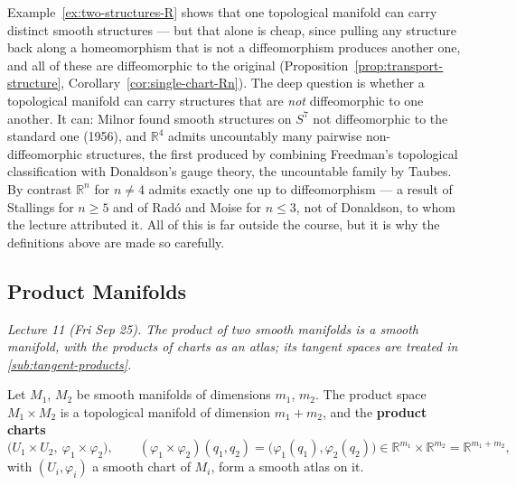 \documentclass[11pt]{report}
\makeatletter
\newcounter{thmcounter}[section]
\newcommand{\thmlabel}[1]{\edef\@currentlabel{\arabic{section}.\arabic{thmcounter}}\label{#1}}
\newcommand{\leeref}[1]{\par\smallskip{\raggedleft\footnotesize\textsc{Lee}:\ #1\par}}
\makeatother
\begin{document}
\begin{rembox}\label{rem:distinct-structures-versus-non-diffeomorphic}
Example~\ref{ex:two-structures-R} shows that one topological manifold can carry distinct smooth structures --- but that alone is cheap, since pulling any structure back along a homeomorphism that is not a diffeomorphism produces another one, and all of these are diffeomorphic to the original (Proposition~\ref{prop:transport-structure}, Corollary~\ref{cor:single-chart-Rn}). The deep question is whether a topological manifold can carry structures that are \emph{not} diffeomorphic to one another. It can: Milnor found smooth structures on $S^7$ not diffeomorphic to the standard one (1956), and $\mathbb{R}^4$ admits uncountably many pairwise non-diffeomorphic structures, the first produced by combining Freedman's topological classification with Donaldson's gauge theory, the uncountable family by Taubes. By contrast $\mathbb{R}^n$ for $n \neq 4$ admits exactly one up to diffeomorphism --- a result of Stallings for $n \ge 5$ and of Rad\'o and Moise for $n \le 3$, not of Donaldson, to whom the lecture attributed it. All of this is far outside the course, but it is why the definitions above are made so carefully.
\end{rembox}

\subsection{Product Manifolds}\label{sub:product-manifolds}

\textit{Lecture 11 (Fri Sep 25). The product of two smooth manifolds is a smooth manifold, with the products of charts as an atlas; its tangent spaces are treated in \ref{sub:tangent-products}.}

\begin{propbox}\thmlabel{prop:product-manifold}
Let $M_1$, $M_2$ be smooth manifolds of dimensions $m_1$, $m_2$. The product space $M_1 \times M_2$ is a topological manifold of dimension $m_1 + m_2$, and the \textbf{product charts}
\[
\big(U_1 \times U_2,\ \varphi_1 \times \varphi_2\big), \qquad (\varphi_1 \times \varphi_2)(q_1, q_2) = \big(\varphi_1(q_1), \varphi_2(q_2)\big) \in \mathbb{R}^{m_1} \times \mathbb{R}^{m_2} = \mathbb{R}^{m_1 + m_2},
\]
with $(U_i, \varphi_i)$ a smooth chart of $M_i$, form a smooth atlas on it.
\leeref{Example 1.34}
\end{propbox}
\end{document}
